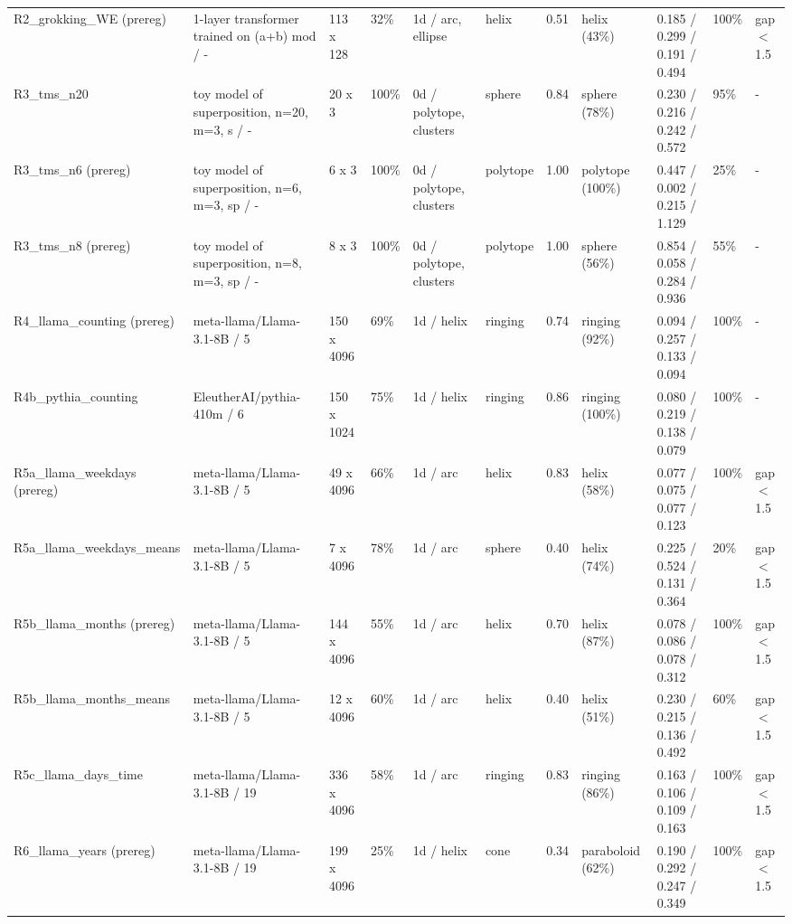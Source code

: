 \begin{tabular}{lllllllllll}
R2\_grokking\_WE (prereg) & 1-layer transformer trained on (a+b) mod / - & 113 x 128 & 32\% & 1d / arc, ellipse & helix & 0.51 & helix (43\%) & 0.185 / 0.299 / 0.191 / 0.494 & 100\% & gap$<$1.5 \\
R3\_tms\_n20 & toy model of superposition, n=20, m=3, s / - & 20 x 3 & 100\% & 0d / polytope, clusters & sphere & 0.84 & sphere (78\%) & 0.230 / 0.216 / 0.242 / 0.572 & 95\% & - \\
R3\_tms\_n6 (prereg) & toy model of superposition, n=6, m=3, sp / - & 6 x 3 & 100\% & 0d / polytope, clusters & polytope & 1.00 & polytope (100\%) & 0.447 / 0.002 / 0.215 / 1.129 & 25\% & - \\
R3\_tms\_n8 (prereg) & toy model of superposition, n=8, m=3, sp / - & 8 x 3 & 100\% & 0d / polytope, clusters & polytope & 1.00 & sphere (56\%) & 0.854 / 0.058 / 0.284 / 0.936 & 55\% & - \\
R4\_llama\_counting (prereg) & meta-llama/Llama-3.1-8B / 5 & 150 x 4096 & 69\% & 1d / helix & ringing & 0.74 & ringing (92\%) & 0.094 / 0.257 / 0.133 / 0.094 & 100\% & - \\
R4b\_pythia\_counting & EleutherAI/pythia-410m / 6 & 150 x 1024 & 75\% & 1d / helix & ringing & 0.86 & ringing (100\%) & 0.080 / 0.219 / 0.138 / 0.079 & 100\% & - \\
R5a\_llama\_weekdays (prereg) & meta-llama/Llama-3.1-8B / 5 & 49 x 4096 & 66\% & 1d / arc & helix & 0.83 & helix (58\%) & 0.077 / 0.075 / 0.077 / 0.123 & 100\% & gap$<$1.5 \\
R5a\_llama\_weekdays\_means & meta-llama/Llama-3.1-8B / 5 & 7 x 4096 & 78\% & 1d / arc & sphere & 0.40 & helix (74\%) & 0.225 / 0.524 / 0.131 / 0.364 & 20\% & gap$<$1.5 \\
R5b\_llama\_months (prereg) & meta-llama/Llama-3.1-8B / 5 & 144 x 4096 & 55\% & 1d / arc & helix & 0.70 & helix (87\%) & 0.078 / 0.086 / 0.078 / 0.312 & 100\% & gap$<$1.5 \\
R5b\_llama\_months\_means & meta-llama/Llama-3.1-8B / 5 & 12 x 4096 & 60\% & 1d / arc & helix & 0.40 & helix (51\%) & 0.230 / 0.215 / 0.136 / 0.492 & 60\% & gap$<$1.5 \\
R5c\_llama\_days\_time & meta-llama/Llama-3.1-8B / 19 & 336 x 4096 & 58\% & 1d / arc & ringing & 0.83 & ringing (86\%) & 0.163 / 0.106 / 0.109 / 0.163 & 100\% & gap$<$1.5 \\
R6\_llama\_years (prereg) & meta-llama/Llama-3.1-8B / 19 & 199 x 4096 & 25\% & 1d / helix & cone & 0.34 & paraboloid (62\%) & 0.190 / 0.292 / 0.247 / 0.349 & 100\% & gap$<$1.5 \\

\end{tabular}

